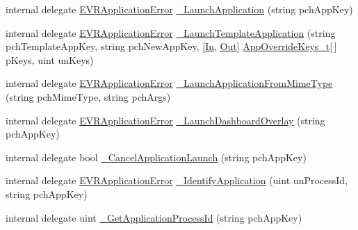 \begin{DoxyCompactItemize}
\item 
internal delegate \mbox{\hyperlink{namespace_valve_1_1_v_r_a3488adab8a219b579fcee50f4e63a8b6}{E\+V\+R\+Application\+Error}} \mbox{\hyperlink{struct_valve_1_1_v_r_1_1_i_v_r_applications_acc906c27dba9c0fbc2398ae17e058352}{\+\_\+\+Launch\+Application}} (string pch\+App\+Key)
\item 
internal delegate \mbox{\hyperlink{namespace_valve_1_1_v_r_a3488adab8a219b579fcee50f4e63a8b6}{E\+V\+R\+Application\+Error}} \mbox{\hyperlink{struct_valve_1_1_v_r_1_1_i_v_r_applications_aeefde1c2d898ac0a0c855e15945f2bf3}{\+\_\+\+Launch\+Template\+Application}} (string pch\+Template\+App\+Key, string pch\+New\+App\+Key, \mbox{[}\mbox{\hyperlink{namespace_valve_1_1_v_r_a1e6192cb5ddaf204afab87ccb5728780aefeb369cccbd560588a756610865664c}{In}}, \mbox{\hyperlink{namespace_valve_1_1_v_r_a1e6192cb5ddaf204afab87ccb5728780a7c147cda9e49590f6abe83d118b7353b}{Out}}\mbox{]} \mbox{\hyperlink{struct_valve_1_1_v_r_1_1_app_override_keys__t}{App\+Override\+Keys\+\_\+t}}\mbox{[}$\,$\mbox{]} p\+Keys, uint un\+Keys)
\item 
internal delegate \mbox{\hyperlink{namespace_valve_1_1_v_r_a3488adab8a219b579fcee50f4e63a8b6}{E\+V\+R\+Application\+Error}} \mbox{\hyperlink{struct_valve_1_1_v_r_1_1_i_v_r_applications_afcb2effe091e7d38b37d3eaac945c8ef}{\+\_\+\+Launch\+Application\+From\+Mime\+Type}} (string pch\+Mime\+Type, string pch\+Args)
\item 
internal delegate \mbox{\hyperlink{namespace_valve_1_1_v_r_a3488adab8a219b579fcee50f4e63a8b6}{E\+V\+R\+Application\+Error}} \mbox{\hyperlink{struct_valve_1_1_v_r_1_1_i_v_r_applications_ac221f4e68eefcfe2a8401a4fe5411d32}{\+\_\+\+Launch\+Dashboard\+Overlay}} (string pch\+App\+Key)
\item 
internal delegate bool \mbox{\hyperlink{struct_valve_1_1_v_r_1_1_i_v_r_applications_a6717c85896fa77981281c2ad3694d5a5}{\+\_\+\+Cancel\+Application\+Launch}} (string pch\+App\+Key)
\item 
internal delegate \mbox{\hyperlink{namespace_valve_1_1_v_r_a3488adab8a219b579fcee50f4e63a8b6}{E\+V\+R\+Application\+Error}} \mbox{\hyperlink{struct_valve_1_1_v_r_1_1_i_v_r_applications_a461680d41f9d889cd818446eb65c113b}{\+\_\+\+Identify\+Application}} (uint un\+Process\+Id, string pch\+App\+Key)
\item 
internal delegate uint \mbox{\hyperlink{struct_valve_1_1_v_r_1_1_i_v_r_applications_a1ee4e4ced406991223199be10cee99af}{\+\_\+\+Get\+Application\+Process\+Id}} (string pch\+App\+Key)
\item 

\end{DoxyCompactItemize}
